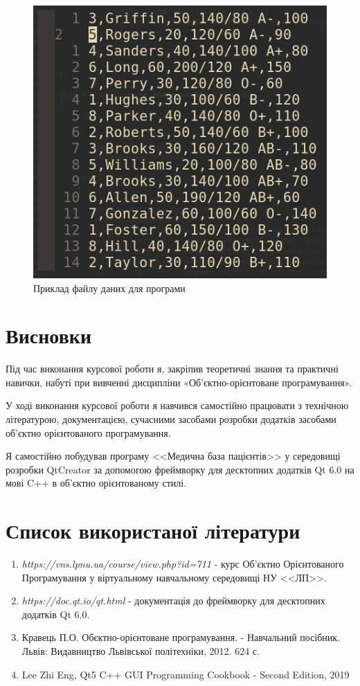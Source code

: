 \documentclass[oneside,14pt]{extarticle}
\begin{document}
\begin{figure}[H]
	\centering
	\includegraphics[scale=0.7]{23}
	\caption{Приклад файлу даних для програми}
\end{figure}

\section*{Висновки}
Під час виконання курсової роботи я, закріпив теоретичні знання та практичні навички, набуті при вивченні дисципліни «Об'єктно-орієнтоване програмування».

У ході виконання курсової роботи я навчився самостійно працювати з технічною літературою, документацією, сучасними засобами розробки додатків засобами об'єктно орієнтованого програмування.

Я самостійно побудував програму <<Медична база пацієнтів>> у середовищі розробки QtCreator за допомогою фреймворку для десктопних додатків Qt 6.0 на мові C++ в об'єктно орієнтованому стилі.

\section*{Список використаної літератури}
\begin{enumerate}
	\item \textit{https://vns.lpnu.ua/course/view.php?id=711} - курс Об'єктно Орієнтованого Програмування у віртуальному навчальному середовищі НУ <<ЛП>>.
	\item \textit{https://doc.qt.io/qt.html} - документація до фреймворку для десктопних додатків Qt 6.0.
	\item Кравець П.О. Обєктно-орієнтоване програмування. - Навчальний посібник. Львів: Видавництво Львівської політехніки, 2012. 624 с.
	\item Lee Zhi Eng, Qt5 C++ GUI Programming Cookbook - Second Edition, 2019
\end{enumerate}
\end{document}
